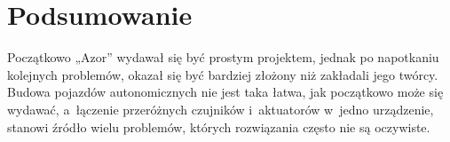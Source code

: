 \section{Podsumowanie}
    \tab Początkowo „Azor” wydawał się być prostym projektem, jednak po napotkaniu kolejnych problemów, okazał się być bardziej złożony niż zakładali jego twórcy.
    Budowa pojazdów autonomicznych nie jest taka łatwa, jak początkowo może się wydawać, a~łączenie przeróżnych czujników i~aktuatorów w~jedno urządzenie, stanowi źródło wielu problemów, których rozwiązania często nie są oczywiste.